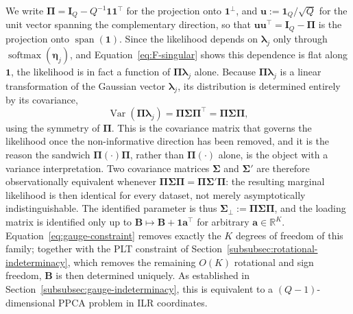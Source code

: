 We write $\bm{\Pi}=\mathbf{I}_Q-Q^{-1}\mathbf{1}\mathbf{1}^\top$ for the projection onto $\mathbf{1}^\perp$, and $\mathbf{u}:=\mathbf{1}_Q/\sqrt{Q}$ for the unit vector spanning the complementary direction, so that $\mathbf{u}\mathbf{u}^\top=\mathbf{I}_Q-\bm{\Pi}$ is the projection onto $\operatorname{span}(\mathbf{1})$. Since the likelihood depends on $\bm{\lambda}_j$ only through $\operatorname{softmax}(\bm{\eta}_j)$, and Equation~\eqref{eq:F-singular} shows this dependence is flat along $\mathbf{1}$, the likelihood is in fact a function of $\bm{\Pi}\bm{\lambda}_j$ alone. Because $\bm{\Pi}\bm{\lambda}_j$ is a linear transformation of the Gaussian vector $\bm{\lambda}_j$, its distribution is determined entirely by its covariance,
\begin{equation}
\operatorname{Var}(\bm{\Pi}\bm{\lambda}_j)=\bm{\Pi}\bm{\Sigma}\bm{\Pi}^\top=\bm{\Pi}\bm{\Sigma}\bm{\Pi},
\end{equation}
using the symmetry of $\bm{\Pi}$. This is the covariance matrix that governs the likelihood once the non-informative direction has been removed, and it is the reason the sandwich $\bm{\Pi}(\cdot)\bm{\Pi}$, rather than $\bm{\Pi}(\cdot)$ alone, is the object with a variance interpretation. Two covariance matrices $\bm{\Sigma}$ and $\bm{\Sigma}'$ are therefore observationally equivalent whenever $\bm{\Pi}\bm{\Sigma}\bm{\Pi}=\bm{\Pi}\bm{\Sigma}'\bm{\Pi}$: the resulting marginal likelihood is then identical for every dataset, not merely asymptotically indistinguishable. The identified parameter is thus $\bm{\Sigma}_\perp:=\bm{\Pi}\bm{\Sigma}\bm{\Pi}$, and the loading matrix is identified only up to $\mathbf{B}\mapsto\mathbf{B}+\mathbf{1}\mathbf{a}^\top$ for arbitrary $\mathbf{a}\in\mathbb{R}^K$. Equation~\eqref{eq:gauge-constraint} removes exactly the $K$ degrees of freedom of this family; together with the PLT constraint of Section~\ref{subsubsec:rotational-indeterminacy}, which removes the remaining $O(K)$ rotational and sign freedom, $\mathbf{B}$ is then determined uniquely. As established in Section~\ref{subsubsec:gauge-indeterminacy}, this is equivalent to a $(Q-1)$-dimensional PPCA problem in ILR coordinates.
 
